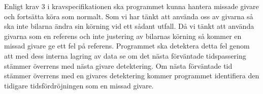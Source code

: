 Enligt krav 3 i kravspecifikationen ska programmet kunna hantera missade givare
och fortsätta köra som normalt. Som vi har tänkt att använda oss av givarna så
ska inte bilarna ändra sin körning vid ett sådant utfall. Då vi tänkt att
använda givarna som en referens och inte justering av bilarnas körning så
kommer en missad givare ge ett fel på referens. Programmet ska detektera detta
fel genom att med dess interna lagring av data se om det nästa förväntade
tidspassering stämmer överrens med nästa givare detektering. Om nästa
förväntade tid stämmer överrens med en givares detektering kommer programmet
identifiera den tidigare tidsfördröjningen som en missad givare.
